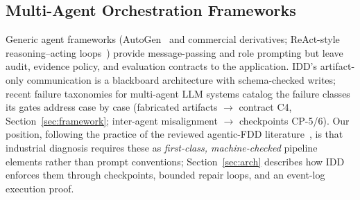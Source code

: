 \documentclass[preprint,10pt]{elsarticle}
\begin{document}
\begin{table}[!t]
\caption{Positioning against the closest published systems. Each row scores a published or contemporaneous system on real time-series input, scenario-level root-cause analysis, an evidence trail, cap-enforced confidence, and a reproducibility gate; IDD is the only system that combines all five. ``Repro.\ gate'' rates whether the system's evaluation is machine-replayed end to end (IDD: internal to our own harness; the trust boundary it operates under is consolidated in Section~\ref{sec:discussion}); PCA/deep FDD baselines are ``partial'' because detection rates are reproducible but diagnosis claims are not. AgentRCA is a contemporaneous non-peer-reviewed preprint.}
\label{tab:related}
\centering
\footnotesize
{}
\end{table}

\subsection{Multi-Agent Orchestration Frameworks}
Generic agent frameworks (AutoGen~\cite{wu2023autogen} and commercial derivatives; ReAct-style reasoning--acting loops~\cite{yao2023react}) provide message-passing and role prompting but leave audit, evidence policy, and evaluation contracts to the application. IDD's artifact-only communication is a blackboard architecture with schema-checked writes; recent failure taxonomies for multi-agent LLM systems \cite{cemri2025mast} catalog the failure classes its gates address case by case (fabricated artifacts $\to$ contract C4, Section~\ref{sec:framework}; inter-agent misalignment $\to$ checkpoints CP-5/6). Our position, following the practice of the reviewed agentic-FDD literature~\cite{agentic2026review}, is that industrial diagnosis requires these as \emph{first-class, machine-checked} pipeline elements rather than prompt conventions; Section~\ref{sec:arch} describes how IDD enforces them through checkpoints, bounded repair loops, and an event-log execution proof.
\end{document}
